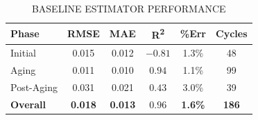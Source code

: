 \begin{table}[H]
    \caption{BASELINE ESTIMATOR PERFORMANCE}
    \label{tab:baseline_results}
    \begin{center}
        \footnotesize
        \begin{tabular}{lccccc}
            \hline
            \textbf{Phase} & \textbf{RMSE} & \textbf{MAE} & \textbf{R\textsuperscript{2}} & \textbf{\%Err} & \textbf{Cycles} \\
            \hline
            Initial & 0.015 & 0.012 & $-0.81$ & 1.3\% & 48 \\
            Aging & 0.011 & 0.010 & $0.94$ & 1.1\% & 99 \\
            Post-Aging & 0.031 & 0.021 & $0.43$ & 3.0\% & 39 \\
            \hline
            \textbf{Overall} & \textbf{0.018} & \textbf{0.013} & $\mathbf{0.96}$ & \textbf{1.6\%} & \textbf{186} \\
            \hline
        \end{tabular}
    \end{center}
\end{table}

